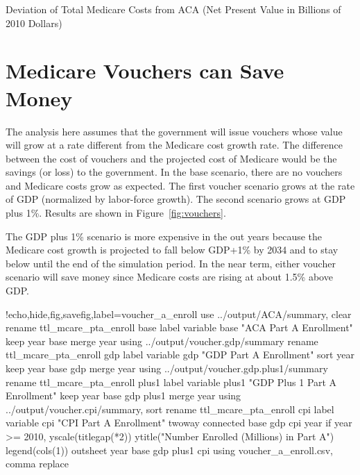 \documentclass{article}
\begin{document}
\begin{table}[ht]
\centering
\caption{Deviation of Total Medicare Costs from ACA (Net Present Value in Billions of 2010 Dollars)}
\label{tab:partb_deviation}
\end{table}

\section{Medicare Vouchers can Save Money}

The analysis here assumes that the government will issue vouchers whose value will grow at a rate different from the Medicare cost growth rate. The difference between the cost of vouchers and the projected cost of Medicare would be the savings (or loss) to the government. In the base scenario, there are no vouchers and Medicare costs grow as expected. The first voucher scenario grows at the rate of GDP (normalized by labor-force growth). The second scenario grows at GDP plus 1\%. Results are shown in Figure~\ref{fig:vouchers}.

The GDP plus 1\% scenario is more expensive in the out years because the Medicare cost growth is projected to fall below GDP+1\% by 2034 and to stay below until the end of the simulation period. In the near term, either voucher scenario will save money since Medicare costs are rising at about 1.5\% above GDP.

\begin{Statacode}{!echo,hide,fig,savefig,label=voucher_a_enroll}
use ../output/ACA/summary, clear
rename ttl_mcare_pta_enroll base
label variable base "ACA Part A Enrollment"
keep year base
merge year using ../output/voucher.gdp/summary
rename ttl_mcare_pta_enroll gdp
label variable gdp "GDP Part A Enrollment"
sort year
keep year base gdp
merge year using ../output/voucher.gdp.plus1/summary
rename ttl_mcare_pta_enroll plus1
label variable plus1 "GDP Plus 1 Part A Enrollment"
keep year base gdp plus1
merge year using ../output/voucher.cpi/summary, sort
rename ttl_mcare_pta_enroll cpi
label variable cpi "CPI Part A Enrollment"
twoway connected base gdp cpi year if year >= 2010, yscale(titlegap(*2)) ytitle("Number Enrolled (Millions) in Part A") legend(cols(1))
outsheet year base gdp plus1 cpi using voucher_a_enroll.csv, comma replace
\end{Statacode}
\end{document}
